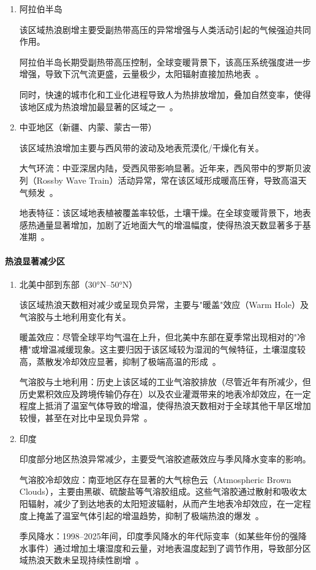 \documentclass[a4paper,UTF8,scheme=chinese,zihao=-4,twoside]{ctexart}
\makeatletter
\newcommand{\初号}{\zihao{0}}
\newcommand{\小初}{\zihao{-0}}
\newcommand{\一号}{\zihao{1}}
\newcommand{\小一}{\zihao{-1}}
\newcommand{\二号}{\zihao{2}}
\newcommand{\小二}{\zihao{-2}}
\newcommand{\三号}{\zihao{3}}
\newcommand{\小三}{\zihao{-3}}
\newcommand{\四号}{\zihao{4}}
\newcommand{\小四}{\zihao{-4}}
\newcommand{\五号}{\zihao{5}}
\newcommand{\小五}{\zihao{-5}}
\newcommand{\六号}{\zihao{6}}
\newcommand{\小六}{\zihao{-6}}
\newcommand{\七号}{\zihao{7}}
\newcommand{\八号}{\zihao{8}}
\newcommand{\宋体}{\songti}
\newcommand{\黑体}{\heiti}
\newcommand{\仿宋}{\fangsong}
\newcommand{\楷书}{\kaishu}
\newcommand{\粗体}{\bfseries}
\newcommand{\斜体}{\itshape}
\newcommand\下划线[2][6em]{\hskip1pt\underline{\hb@xt@ #1{\hss#2\hss}}\hskip3pt}
\makeatother
\begin{document}
\begin{enumerate}
    \item 阿拉伯半岛

        该区域热浪剧增主要受副热带高压的异常增强与人类活动引起的气候强迫共同作用。

        阿拉伯半岛长期受副热带高压控制，全球变暖背景下，该高压系统强度进一步增强，导致下沉气流更盛，云量极少，太阳辐射直接加热地表~\cite{almazroui2014}。

        同时，快速的城市化和工业化进程导致人为热排放增加，叠加自然变率，使得该地区成为热浪增加最显著的区域之一~\cite{lelieveld2016}。

    \item 中亚地区（新疆、内蒙、蒙古一带）

        该区域热浪增加主要与西风带的波动及地表荒漠化/干燥化有关。

        大气环流：中亚深居内陆，受西风带影响显著。近年来，西风带中的罗斯贝波列（Rossby Wave Train）活动异常，常在该区域形成暖高压脊，导致高温天气频发~\cite{wang2019}。

        地表特征：该区域地表植被覆盖率较低，土壤干燥。在全球变暖背景下，地表感热通量显著增加，加剧了近地面大气的增温幅度，使得热浪天数显著多于基准期~\cite{hu2020}。
\end{enumerate}

\paragraph{热浪显著减少区}

\begin{enumerate}
    \item 北美中部到东部（30°N–50°N）

        该区域热浪天数相对减少或呈现负异常，主要与"暖盖"效应（Warm Hole）及气溶胶与土地利用变化有关。

        暖盖效应：尽管全球平均气温在上升，但北美中东部在夏季常出现相对的"冷槽"或增温减缓现象。这主要归因于该区域较为湿润的气候特征，土壤湿度较高，蒸散发冷却效应显著，抑制了极端高温的形成~\cite{mueller2015}。

        气溶胶与土地利用：历史上该区域的工业气溶胶排放（尽管近年有所减少，但历史累积效应及跨境传输仍存在）以及农业灌溉带来的地表冷却效应，在一定程度上抵消了温室气体导致的增温，使得热浪天数相对于全球其他干旱区增加较慢，甚至在对比中呈现负异常~\cite{leibensperger2012}。

    \item 印度

        印度部分地区热浪异常减少，主要受气溶胶遮蔽效应与季风降水变率的影响。

        气溶胶冷却效应：南亚地区存在显著的大气棕色云（Atmospheric Brown Clouds），主要由黑碳、硫酸盐等气溶胶组成。这些气溶胶通过散射和吸收太阳辐射，减少了到达地表的太阳短波辐射，从而产生地表冷却效应，在一定程度上掩盖了温室气体引起的增温趋势，抑制了极端热浪的爆发~\cite{ramanathan2008}。

        季风降水：1998–2025年间，印度季风降水的年代际变率（如某些年份的强降水事件）通过增加土壤湿度和云量，对地表温度起到了调节作用，导致部分区域热浪天数未呈现持续性剧增~\cite{roxy2015}。
\end{enumerate}
\end{document}

